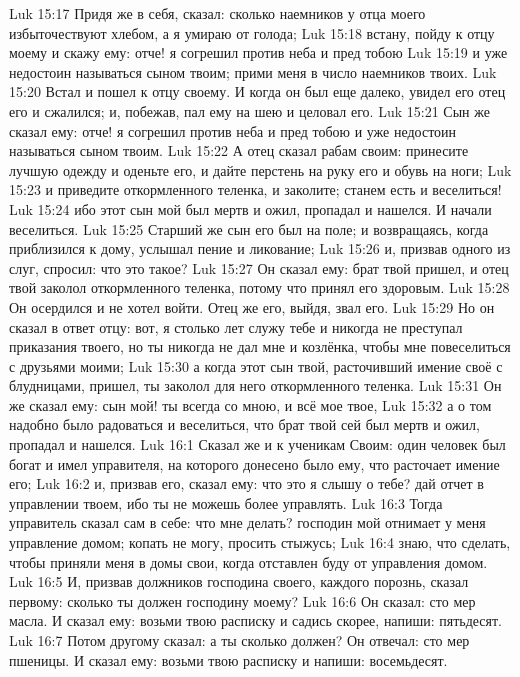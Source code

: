 \vs Luk 15:17 Придя же в себя, сказал: сколько наемников у отца моего избыточествуют хлебом, а я умираю от голода;
\vs Luk 15:18 встану, пойду к отцу моему и скажу ему: отче! я согрешил против неба и пред тобою
\vs Luk 15:19 и уже недостоин называться сыном твоим; прими меня в число наемников твоих.
\vs Luk 15:20 Встал и пошел к отцу своему. И когда он был еще далеко, увидел его отец его и сжалился; и, побежав, пал ему на шею и целовал его.
\vs Luk 15:21 Сын же сказал ему: отче! я согрешил против неба и пред тобою и уже недостоин называться сыном твоим.
\vs Luk 15:22 А отец сказал рабам своим: принесите лучшую одежду и оденьте его, и дайте перстень на руку его и обувь на ноги;
\vs Luk 15:23 и приведите откормленного теленка, и заколите; станем есть и веселиться!
\vs Luk 15:24 ибо этот сын мой был мертв и ожил, пропадал и нашелся. И начали веселиться.
\vs Luk 15:25 Старший же сын его был на поле; и возвращаясь, когда приблизился к дому, услышал пение и ликование;
\vs Luk 15:26 и, призвав одного из слуг, спросил: что это такое?
\vs Luk 15:27 Он сказал ему: брат твой пришел, и отец твой заколол откормленного теленка, потому что принял его здоровым.
\vs Luk 15:28 Он осердился и не хотел войти. Отец же его, выйдя, звал его.
\vs Luk 15:29 Но он сказал в ответ отцу: вот, я столько лет служу тебе и никогда не преступал приказания твоего, но ты никогда не дал мне и козлёнка, чтобы мне повеселиться с друзьями моими;
\vs Luk 15:30 а когда этот сын твой, расточивший имение своё с блудницами, пришел, ты заколол для него откормленного теленка.
\vs Luk 15:31 Он же сказал ему: сын мой! ты всегда со мною, и всё мое твое,
\vs Luk 15:32 а о том надобно было радоваться и веселиться, что брат твой сей был мертв и ожил, пропадал и нашелся.
\vs Luk 16:1 Сказал же и к ученикам Своим: один человек был богат и имел управителя, на которого донесено было ему, что расточает имение его;
\vs Luk 16:2 и, призвав его, сказал ему: что это я слышу о тебе? дай отчет в управлении твоем, ибо ты не можешь более управлять.
\vs Luk 16:3 Тогда управитель сказал сам в себе: что мне делать? господин мой отнимает у меня управление домом; копать не могу, просить стыжусь;
\vs Luk 16:4 знаю, что сделать, чтобы приняли меня в домы свои, когда отставлен буду от управления домом.
\vs Luk 16:5 И, призвав должников господина своего, каждого порознь, сказал первому: сколько ты должен господину моему?
\vs Luk 16:6 Он сказал: сто мер масла. И сказал ему: возьми твою расписку и садись скорее, напиши: пятьдесят.
\vs Luk 16:7 Потом другому сказал: а ты сколько должен? Он отвечал: сто мер пшеницы. И сказал ему: возьми твою расписку и напиши: восемьдесят.
